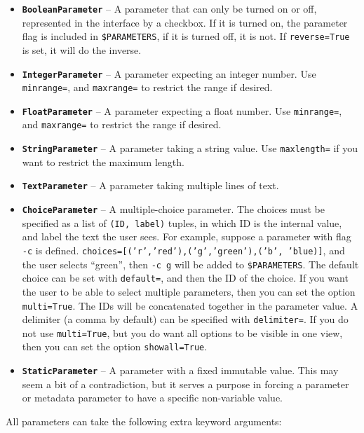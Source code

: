 \documentclass[a4paper,12pt]{report}
\begin{document}
\begin{itemize}
\item \textbf{\texttt{BooleanParameter}} -- A parameter that can only be turned on or off, represented in the interface by a checkbox. If it is turned on, the parameter flag is included in \texttt{\$PARAMETERS}, if it is turned off, it is not. If \texttt{reverse=True} is set, it will do the inverse.
\item \textbf{\texttt{IntegerParameter}} -- A parameter expecting an integer number. Use \texttt{minrange=}, and \texttt{maxrange=} to restrict the range if desired.
\item \textbf{\texttt{FloatParameter}} -- A parameter expecting a float number. Use \texttt{minrange=}, and \texttt{maxrange=} to restrict the range if desired.
\item \textbf{\texttt{StringParameter}} -- A parameter taking a string value. Use \texttt{maxlength=} if you want to restrict the maximum length.
\item \textbf{\texttt{TextParameter}} -- A parameter taking multiple lines of text. 
\item \textbf{\texttt{ChoiceParameter}} -- A multiple-choice parameter. The choices must be specified as a list of \texttt{(ID, label)} tuples, in which ID is the internal value, and label the text the user sees. For example, suppose a parameter with flag \texttt{-c} is defined.  \texttt{choices=[('r','red'),('g','green'),('b', 'blue)]}, and the user selects ``green'', then  \texttt{-c g} will be added to \texttt{\$PARAMETERS}. The default choice can be set with \texttt{default=}, and then the ID of the choice. If you want the user to be able to select multiple parameters, then you can set the option \texttt{multi=True}. The IDs will be concatenated together in the parameter value. A delimiter (a comma by default) can be specified with \texttt{delimiter=}. If you do not use \texttt{multi=True}, but you do want all options to be visible in one view, then you can set the option \texttt{showall=True}.
\item \textbf{\texttt{StaticParameter}} -- A parameter with a fixed immutable value. This may seem a bit of a contradiction, but it serves a purpose in forcing a parameter or metadata parameter to have a specific non-variable value.
\end{itemize}

All parameters can take the following extra keyword arguments:
\end{document}

